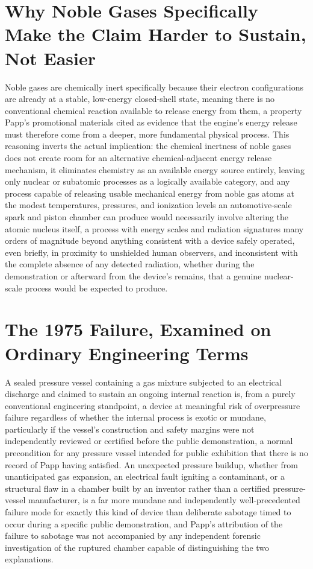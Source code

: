 \documentclass[11pt]{article}
\begin{document}
\section{Why Noble Gases Specifically Make the Claim Harder to Sustain, Not Easier}

Noble gases are chemically inert specifically because their electron configurations are already at a stable, low-energy closed-shell state, meaning there is no conventional chemical reaction available to release energy from them, a property Papp's promotional materials cited as evidence that the engine's energy release must therefore come from a deeper, more fundamental physical process. This reasoning inverts the actual implication: the chemical inertness of noble gases does not create room for an alternative chemical-adjacent energy release mechanism, it eliminates chemistry as an available energy source entirely, leaving only nuclear or subatomic processes as a logically available category, and any process capable of releasing usable mechanical energy from noble gas atoms at the modest temperatures, pressures, and ionization levels an automotive-scale spark and piston chamber can produce would necessarily involve altering the atomic nucleus itself, a process with energy scales and radiation signatures many orders of magnitude beyond anything consistent with a device safely operated, even briefly, in proximity to unshielded human observers, and inconsistent with the complete absence of any detected radiation, whether during the demonstration or afterward from the device's remains, that a genuine nuclear-scale process would be expected to produce.

\section{The 1975 Failure, Examined on Ordinary Engineering Terms}

A sealed pressure vessel containing a gas mixture subjected to an electrical discharge and claimed to sustain an ongoing internal reaction is, from a purely conventional engineering standpoint, a device at meaningful risk of overpressure failure regardless of whether the internal process is exotic or mundane, particularly if the vessel's construction and safety margins were not independently reviewed or certified before the public demonstration, a normal precondition for any pressure vessel intended for public exhibition that there is no record of Papp having satisfied. An unexpected pressure buildup, whether from unanticipated gas expansion, an electrical fault igniting a contaminant, or a structural flaw in a chamber built by an inventor rather than a certified pressure-vessel manufacturer, is a far more mundane and independently well-precedented failure mode for exactly this kind of device than deliberate sabotage timed to occur during a specific public demonstration, and Papp's attribution of the failure to sabotage was not accompanied by any independent forensic investigation of the ruptured chamber capable of distinguishing the two explanations.
\end{document}
